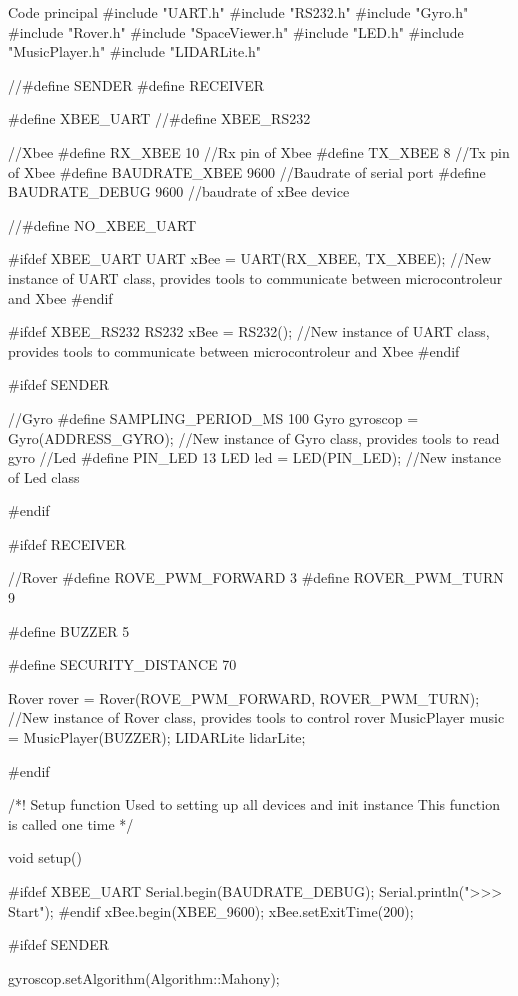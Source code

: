 \begin{Cpp}{Code principal}
#include "UART.h"
#include "RS232.h"
#include "Gyro.h"
#include "Rover.h"
#include "SpaceViewer.h"
#include "LED.h"
#include "MusicPlayer.h"
#include "LIDARLite.h"
 
//#define SENDER  
#define RECEIVER

#define XBEE_UART
//#define XBEE_RS232 

//Xbee
#define RX_XBEE 10   //Rx pin of Xbee
#define TX_XBEE 8  //Tx pin of Xbee
#define BAUDRATE_XBEE 9600    //Baudrate of serial port
#define BAUDRATE_DEBUG 9600   //baudrate of xBee device


//#define NO_XBEE_UART 

#ifdef XBEE_UART
UART xBee = UART(RX_XBEE, TX_XBEE);                     //New instance of UART class, provides tools to communicate between microcontroleur and Xbee
#endif


#ifdef XBEE_RS232
RS232 xBee = RS232();                     //New instance of UART class, provides tools to communicate between microcontroleur and Xbee
#endif

#ifdef SENDER

  //Gyro
  #define SAMPLING_PERIOD_MS 100
  Gyro gyroscop = Gyro(ADDRESS_GYRO);                         //New instance of Gyro class, provides tools to read gyro
  //Led
  #define PIN_LED 13
  LED led = LED(PIN_LED);                                 //New instance of Led class

#endif


#ifdef RECEIVER

  //Rover
  #define ROVE_PWM_FORWARD 3
  #define ROVER_PWM_TURN 9

  #define BUZZER 5

  #define SECURITY_DISTANCE 70
  
  Rover rover = Rover(ROVE_PWM_FORWARD, ROVER_PWM_TURN);  //New instance of Rover class, provides tools to control rover
  MusicPlayer music = MusicPlayer(BUZZER);
  LIDARLite lidarLite;
 

#endif


/*!
  Setup function
  Used to setting up all devices and init instance
  This function is called one time
*/

void setup() {

#ifdef XBEE_UART
  Serial.begin(BAUDRATE_DEBUG);
	Serial.println(">>> Start");
#endif
	xBee.begin(XBEE_9600);
  xBee.setExitTime(200);


#ifdef SENDER
  
  gyroscop.setAlgorithm(Algorithm::Mahony);

}
\end{Cpp}
